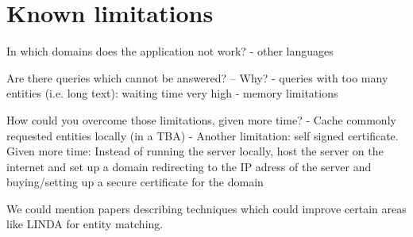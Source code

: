 \section{Known limitations}
In which domains does the application not work? 
- other languages



Are there queries which cannot be answered? – Why? 
- queries with too many entities (i.e. long text): waiting time very high
- memory limitations






How could you overcome those limitations, given more time?
- Cache commonly requested entities locally (in a TBA)
- Another limitation: self signed certificate. Given more time: Instead of running the server locally, host the server on the internet and set up a domain redirecting to the IP adress of the server and buying/setting up a secure certificate for the domain


We could mention papers describing techniques which could improve certain areas like LINDA \cite{boehm_linda:_2012} for entity matching. 


